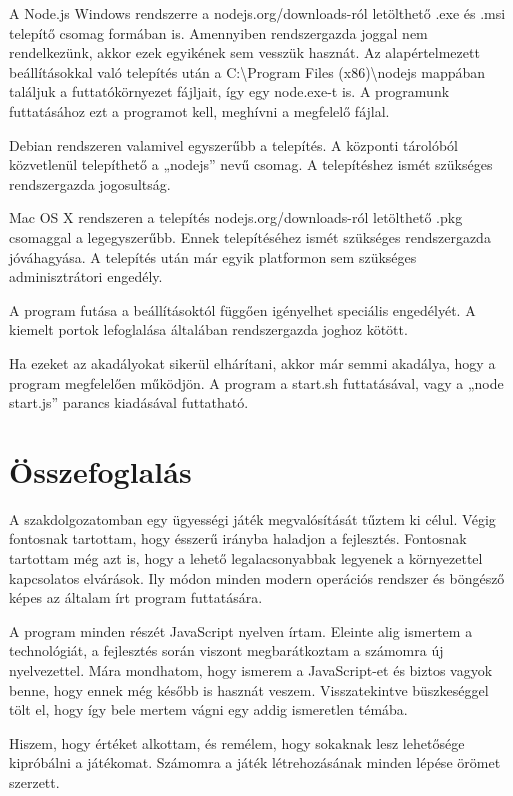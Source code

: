 \documentclass[]{article}
\begin{document}
A Node.js Windows rendszerre a nodejs.org/downloads-ról letölthető .exe
és .msi telepítő csomag formában is. Amennyiben rendszergazda joggal nem
rendelkezünk, akkor ezek egyikének sem vesszük hasznát. Az
alapértelmezett beállításokkal való telepítés után a
C:\textbackslash{}Program Files (x86)\textbackslash{}nodejs mappában
találjuk a futtatókörnyezet fájljait, így egy node.exe-t is. A
programunk futtatásához ezt a programot kell, meghívni a megfelelő
fájlal.

Debian rendszeren valamivel egyszerűbb a telepítés. A központi tárolóból
közvetlenül telepíthető a „nodejs'' nevű csomag. A telepítéshez ismét
szükséges rendszergazda jogosultság.

Mac OS X rendszeren a telepítés nodejs.org/downloads-ról letölthető .pkg
csomaggal a legegyszerűbb. Ennek telepítéséhez ismét szükséges
rendszergazda jóváhagyása. A telepítés után már egyik platformon sem
szükséges adminisztrátori engedély.

A program futása a beállításoktól függően igényelhet speciális
engedélyét. A kiemelt portok lefoglalása általában rendszergazda joghoz
kötött.

Ha ezeket az akadályokat sikerül elhárítani, akkor már semmi akadálya,
hogy a program megfelelően működjön. A program a start.sh futtatásával,
vagy a „node start.js'' parancs kiadásával futtatható.


\section{Összefoglalás}

A szakdolgozatomban egy ügyességi játék megvalósítását tűztem ki célul.
Végig fontosnak tartottam, hogy ésszerű irányba haladjon a fejlesztés.
Fontosnak tartottam még azt is, hogy a lehető legalacsonyabbak legyenek
a környezettel kapcsolatos elvárások. Ily módon minden modern operációs
rendszer és böngésző képes az általam írt program futtatására.

A program minden részét JavaScript nyelven írtam. Eleinte alig ismertem
a technológiát, a fejlesztés során viszont megbarátkoztam a számomra új
nyelvezettel. Mára mondhatom, hogy ismerem a JavaScript-et és biztos
vagyok benne, hogy ennek még később is hasznát veszem. Visszatekintve
büszkeséggel tölt el, hogy így bele mertem vágni egy addig ismeretlen
témába.

Hiszem, hogy értéket alkottam, és remélem, hogy sokaknak lesz lehetősége
kipróbálni a játékomat. Számomra a játék létrehozásának minden lépése
örömet szerzett.
\end{document}
